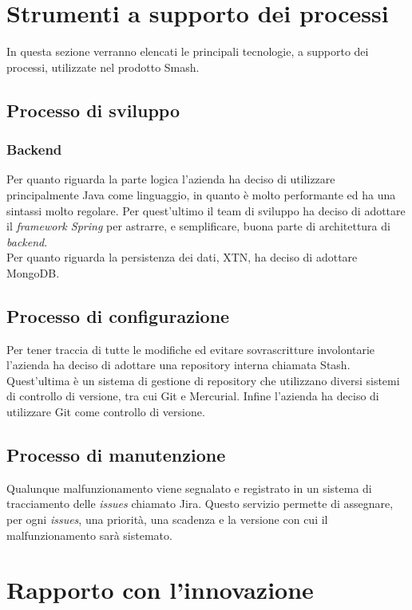 \section{Strumenti a supporto dei processi}
In questa sezione verranno elencati le principali tecnologie, a supporto dei processi, utilizzate nel prodotto Smash\textregistered.
\subsection{Processo di sviluppo}
\subsubsection{Backend}
Per quanto riguarda la parte logica l'azienda ha deciso di utilizzare principalmente Java come linguaggio, in quanto è molto performante ed ha una sintassi molto regolare. Per quest'ultimo il team di sviluppo ha deciso di adottare il \textit{framework Spring} per astrarre, e semplificare, buona parte di architettura di \textit{backend}.\\
Per quanto riguarda la persistenza dei dati, XTN, ha deciso di adottare MongoDB.
\subsection{Processo di configurazione}
Per tener traccia di tutte le modifiche ed evitare sovrascritture involontarie l'azienda ha deciso di adottare una repository interna chiamata Stash. Quest'ultima è un sistema di gestione di repository che utilizzano diversi sistemi di controllo di versione, tra cui Git e Mercurial. Infine l'azienda ha deciso di utilizzare Git come controllo di versione.
\subsection{Processo di manutenzione}
Qualunque malfunzionamento viene segnalato e registrato in un sistema di tracciamento delle \textit{issues} chiamato Jira. Questo servizio permette di assegnare, per ogni \textit{issues}, una priorità, una scadenza e la versione con cui il malfunzionamento sarà sistemato. 
\section{Rapporto con l'innovazione}


